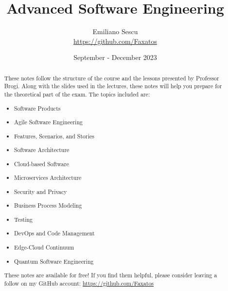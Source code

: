 \documentclass[a4paper,openright]{report}
\title{Advanced Software Engineering}
\date{September - December 2023}
\begin{document}
\author{Emiliano Sescu \\ \url{https://github.com/Faxatos}}
\maketitle
\renewcommand{\abstractname}{Abstract}
\begin{abstract}

\noindent These notes follow the structure of the course and the lessons presented by Professor Brogi. Along with the slides used in the lectures, these notes will help you prepare for the theoretical part of the exam. The topics included are:

\begin{itemize}
    \item Software Products
    \item Agile Software Engineering
    \item Features, Scenarios, and Stories
    \item Software Architecture
    \item Cloud-based Software
    \item Microservices Architecture
    \item Security and Privacy
    \item Business Process Modeling
    \item Testing
    \item DevOps and Code Management
    \item Edge-Cloud Continuum
    \item Quantum Software Engineering
\end{itemize}

\noindent These notes are available for free! If you find them helpful, please consider leaving a follow on my GitHub account: \url{https://github.com/Faxatos} \smiley{}

\end{abstract}

\newpage

\tableofcontents


%























\appendix




%
%
\end{document}
